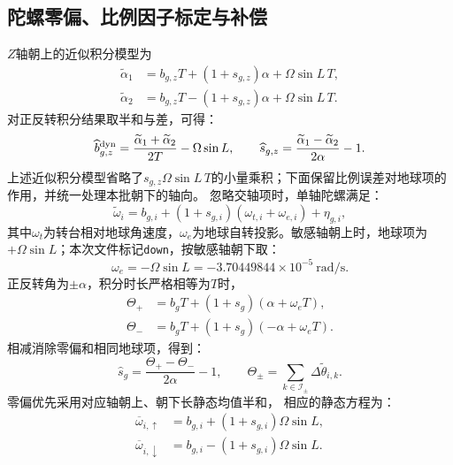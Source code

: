 \subsection{陀螺零偏、比例因子标定与补偿}
$Z$轴朝上的近似积分模型为
\begin{align}
\widetilde\alpha_1&=b_{g,z}T+(1+s_{g,z})\alpha+\Omega\sin L\,T,\label{eq:guideplus}\\
\widetilde\alpha_2&=b_{g,z}T-(1+s_{g,z})\alpha+\Omega\sin L\,T.\label{eq:guideminus}
\end{align}
对正反转积分结果取半和与差，可得：
\begin{equation}
\widehat b_{g,z}^{\rm dyn}=\frac{\widetilde\alpha_1+\widetilde\alpha_2}{2T}-\Omega\sin L,\qquad
\widehat s_{g,z}=\frac{\widetilde\alpha_1-\widetilde\alpha_2}{2\alpha}-1.
\label{eq:guidedynamic}\end{equation}
上述近似积分模型省略了$s_{g,z}\Omega\sin L\,T$的小量乘积；下面保留比例误差对地球项的作用，并统一处理本批朝下的轴向。
忽略交轴项时，单轴陀螺满足：
\begin{equation}
\widetilde\omega_i=b_{g,i}+(1+s_{g,i})(\omega_{t,i}+\omega_{e,i})+\eta_{g,i},
\end{equation}
其中$\omega_t$为转台相对地球角速度，$\omega_e$为地球自转投影。敏感轴朝上时，地球项为$+\Omega\sin L$；本次文件标记\texttt{down}，按敏感轴朝下取：
\begin{equation}
\omega_e=-\Omega\sin L=-3.70449844\times10^{-5}~\mathrm{rad/s}.
\end{equation}
正反转角为$\pm\alpha$，积分时长严格相等为$T$时，
\begin{equation}
\begin{aligned}
\Theta_+&=b_gT+(1+s_g)(\alpha+\omega_eT),\\
\Theta_-&=b_gT+(1+s_g)(-\alpha+\omega_eT).
\end{aligned}\end{equation}
相减消除零偏和相同地球项，得到：
\begin{equation}
\widehat s_g=\frac{\Theta_+-\Theta_-}{2\alpha}-1,\qquad
\Theta_\pm=\sum_{k\in\mathcal I_\pm}\Delta\widetilde\theta_{i,k}.
\label{eq:gyroscale}\end{equation}
零偏优先采用对应轴朝上、朝下长静态均值半和，
相应的静态方程为：
\begin{align}
\overline\omega_{i,\uparrow}&=b_{g,i}+(1+s_{g,i})\Omega\sin L,\label{eq:staticup}\\
\overline\omega_{i,\downarrow}&=b_{g,i}-(1+s_{g,i})\Omega\sin L.\label{eq:staticdown}
\end{align}
